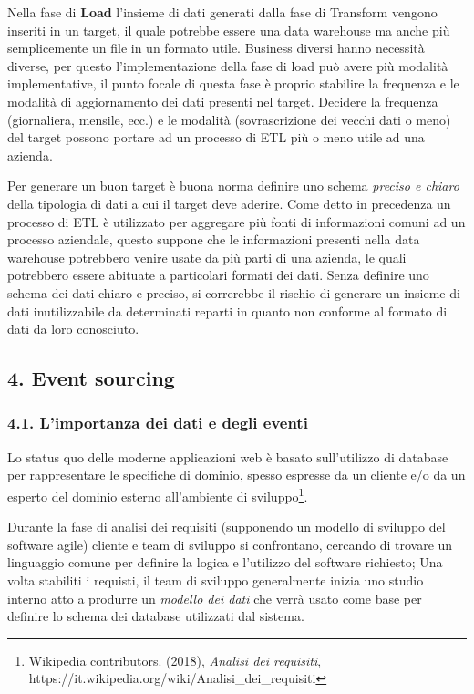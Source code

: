 \documentclass[]{article}
\begin{document}
Nella fase di \textbf{Load} l'insieme di dati generati dalla fase di
Transform vengono inseriti in un target, il quale potrebbe essere una
data warehouse ma anche più semplicemente un file in un formato utile.
Business diversi hanno necessità diverse, per questo l'implementazione
della fase di load può avere più modalità implementative, il punto
focale di questa fase è proprio stabilire la frequenza e le modalità di
aggiornamento dei dati presenti nel target. Decidere la frequenza
(giornaliera, mensile, ecc.) e le modalità (sovrascrizione dei vecchi
dati o meno) del target possono portare ad un processo di ETL più o meno
utile ad una azienda.

Per generare un buon target è buona norma definire uno schema
\emph{preciso e chiaro} della tipologia di dati a cui il target deve
aderire. Come detto in precedenza un processo di ETL è utilizzato per
aggregare più fonti di informazioni comuni ad un processo aziendale,
questo suppone che le informazioni presenti nella data warehouse
potrebbero venire usate da più parti di una azienda, le quali potrebbero
essere abituate a particolari formati dei dati. Senza definire uno
schema dei dati chiaro e preciso, si correrebbe il rischio di generare
un insieme di dati inutilizzabile da determinati reparti in quanto non
conforme al formato di dati da loro conosciuto.

\newpage

\hypertarget{event-sourcing}{\subsection{4. Event
sourcing}\label{event-sourcing}}

\subsubsection{4.1. L'importanza dei dati e degli
eventi}\label{limportanza-dei-dati-e-degli-eventi}

Lo status quo delle moderne applicazioni web è basato sull'utilizzo di
database per rappresentare le specifiche di dominio, spesso espresse da
un cliente e/o da un esperto del dominio esterno all'ambiente di
sviluppo\footnote{Wikipedia contributors. (2018), \emph{Analisi dei
  requisiti},\\
  https://it.wikipedia.org/wiki/Analisi\_dei\_requisiti}.

Durante la fase di analisi dei requisiti (supponendo un modello di
sviluppo del software agile) cliente e team di sviluppo si confrontano,
cercando di trovare un linguaggio comune per definire la logica e
l'utilizzo del software richiesto; Una volta stabiliti i requisti, il
team di sviluppo generalmente inizia uno studio interno atto a produrre
un \emph{modello dei dati} che verrà usato come base per definire lo
schema dei database utilizzati dal sistema.
\end{document}
